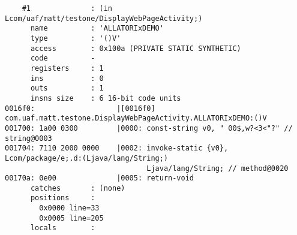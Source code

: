\begin{lstlisting}
    #1              : (in Lcom/uaf/matt/testone/DisplayWebPageActivity;)
      name          : 'ALLATORIxDEMO'
      type          : '()V'
      access        : 0x100a (PRIVATE STATIC SYNTHETIC)
      code          -
      registers     : 1
      ins           : 0
      outs          : 1
      insns size    : 6 16-bit code units
0016f0:                   |[0016f0] com.uaf.matt.testone.DisplayWebPageActivity.ALLATORIxDEMO:()V
001700: 1a00 0300         |0000: const-string v0, "	00$,w?<3<"?" // string@0003
001704: 7110 2000 0000    |0002: invoke-static {v0}, Lcom/package/e;.d:(Ljava/lang/String;)
                                 Ljava/lang/String; // method@0020
00170a: 0e00              |0005: return-void
      catches       : (none)
      positions     :
        0x0000 line=33
        0x0005 line=205
      locals        :


\end{lstlisting}

